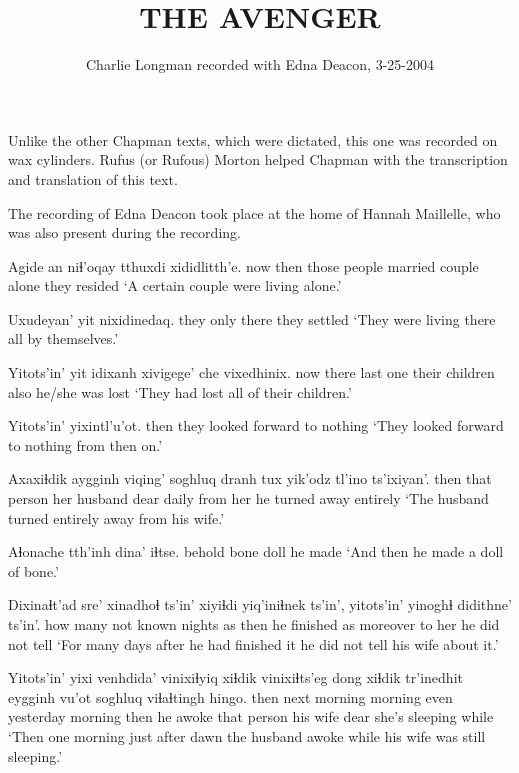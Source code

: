 \documentclass[12pt]{article}
\begin{document}
\title{THE AVENGER}

\author{Charlie Longman \newline recorded with Edna Deacon, 3-25-2004}
\date{}

\maketitle

Unlike the other Chapman texts, which were dictated, this one was recorded on wax cylinders. Rufus (or Rufous) Morton helped Chapman with the transcription and translation of this text.

The recording of Edna Deacon took place at the home of Hannah Maillelle, who was also present during the recording.

\bigskip

\gll  Agide  an niɬ'oqay tthuxdi xididlitth'e. 
{now then} {those people} {married couple} alone {they resided}
\glt `A certain couple were living alone.'
\glend

\gll  Uxudeyan' yit nixidinedaq.
{they only} there {they settled}
\glt `They were living there all by themselves.'
\glend

\gll Yitots'in' yit idixanh xivigege' che vixedhinix.
now  there {last one} {their children} also {he/she was lost}
\glt `They had lost all of their children.'
\glend

\gll Yitots'in' yixintl'u'ot.
then {they looked forward to nothing}
\glt `They looked forward to nothing from then on.'
\glend

\gll Axaxiɬdik aygginh viqing' soghluq {dranh tux} yik'odz tl'ino ts'ixiyan'.
then {that person} {her husband} dear daily {from her} {he turned away} entirely
\glt `The husband turned entirely away from his wife.'
\glend

\gll Aɬonache tth'inh dina' iɬtse.
behold bone doll {he made}
\glt `And then he made a doll of bone.'
\glend

\gll Dixinaɬt'ad sre'  xinadhoɬ ts'in' xiyiɬdi yiq'iniɬnek ts'in', yitots'in' yinoghɬ {didithne' ts'in'.}
{how many} {not known} nights as then  {he finished} as moreover {to her}  {he did not tell}
\glt `For many days after he had finished it he did not tell his wife about it.'
\glend

\gll Yitots'in' {yixi venhdida'} vinixiɬyiq xiɬdik {vinixiɬts'eg dong} xiɬdik tr'inedhit eygginh vu'ot  soghluq viɬaɬtingh hingo.
then  {next morning} morning even {yesterday morning} then {he awoke} {that person} {his wife} dear {she's sleeping} while
\glt `Then one morning just after dawn the husband awoke while his wife was still sleeping.'
\glend
\end{document}
